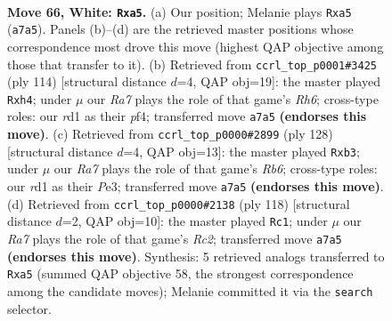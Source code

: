 \documentclass[11pt]{article}
\begin{document}
\clearpage

\begin{figure}[p]\centering
\begin{subfigure}{0.46\textwidth}\centering
\resizebox{\linewidth}{!}{%
\newchessgame
\chessboard[
  setfen={8/R7/7k/p7/5K2/1r6/7P/3r4 w - - 0 66},
  showmover=false,
  pgfstyle=straightmove, color=movearrow, markmove={a7-a5}
]}
\caption{}
\end{subfigure}\hfill
\begin{subfigure}{0.46\textwidth}\centering
\resizebox{\linewidth}{!}{%
\newchessgame
\chessboard[
  setfen={8/4k3/7R/8/5pPp/8/r7/5K2 w - - 0 58},
  showmover=false,
  pgfstyle=straightmove, color=movearrow, markmove={h6-h4}
]}
\caption{}
\end{subfigure}
\\[4pt]
\begin{subfigure}{0.46\textwidth}\centering
\resizebox{\linewidth}{!}{%
\newchessgame
\chessboard[
  setfen={8/8/1R6/3K4/6k1/1p2P3/8/2r5 w - - 0 65},
  showmover=false,
  pgfstyle=straightmove, color=movearrow, markmove={b6-b3}
]}
\caption{}
\end{subfigure}\hfill
\begin{subfigure}{0.46\textwidth}\centering
\resizebox{\linewidth}{!}{%
\newchessgame
\chessboard[
  setfen={7r/1P1k4/8/8/6K1/8/2R3p1/8 w - - 0 60},
  showmover=false,
  pgfstyle=straightmove, color=movearrow, markmove={c2-c1}
]}
\caption{}
\end{subfigure}
\caption{\textbf{Move 66, White: \texttt{Rxa5}.} (a) Our position; Melanie plays \texttt{Rxa5} (\texttt{a7a5}). Panels (b)--(d) are the retrieved master positions whose correspondence most drove this move (highest QAP objective among those that transfer to it). (b) Retrieved from \texttt{ccrl\_top\_p0001\#3425} (ply 114) [structural distance $d$=4, QAP obj=19]: the master played \texttt{Rxh4}; under $\mu$ our \emph{Ra7} plays the role of that game's \emph{Rh6}; cross-type roles: our \emph{r}d1 as their \emph{p}f4; transferred move \texttt{a7a5} \textbf{(endorses this move)}. (c) Retrieved from \texttt{ccrl\_top\_p0000\#2899} (ply 128) [structural distance $d$=4, QAP obj=13]: the master played \texttt{Rxb3}; under $\mu$ our \emph{Ra7} plays the role of that game's \emph{Rb6}; cross-type roles: our \emph{r}d1 as their \emph{P}e3; transferred move \texttt{a7a5} \textbf{(endorses this move)}. (d) Retrieved from \texttt{ccrl\_top\_p0000\#2138} (ply 118) [structural distance $d$=2, QAP obj=10]: the master played \texttt{Rc1}; under $\mu$ our \emph{Ra7} plays the role of that game's \emph{Rc2}; transferred move \texttt{a7a5} \textbf{(endorses this move)}. Synthesis: 5 retrieved analogs transferred to \texttt{Rxa5} (summed QAP objective 58, the strongest correspondence among the candidate moves); Melanie committed it via the \texttt{search} selector.}
\label{fig:thought-m130}
\end{figure}
\end{document}
